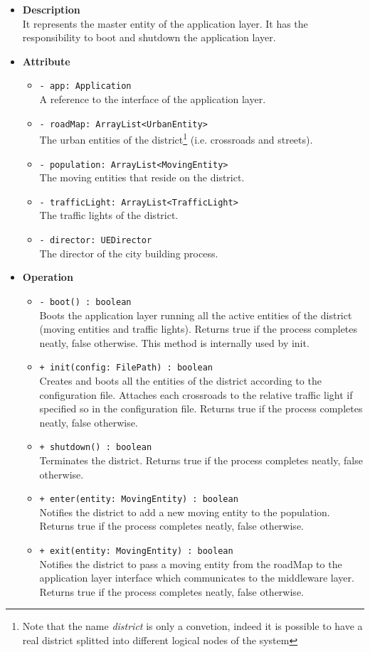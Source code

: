 \begin{itemize}
  \item \textbf{Description} \\
It represents the master entity of the application layer. 
It has the responsibility to boot and shutdown the application layer.
  \item \textbf{Attribute}
  \begin{itemize}
    \item \texttt{- app: Application} \\
A reference to the interface of the application layer.
    \item \texttt{- roadMap: ArrayList<UrbanEntity>} \\
The urban entities of the district\footnote{Note that the name 
\textit{district} is only a convetion, indeed it is possible to have a 
real district splitted into different logical nodes of the system}
(i.e. crossroads and streets). 
    \item \texttt{- population: ArrayList<MovingEntity>} \\
The moving entities that reside on the district.
    \item \texttt{- trafficLight: ArrayList<TrafficLight>} \\
The traffic lights of the district.
    \item \texttt{- director: UEDirector} \\ 
The director of the city building process.
  \end{itemize}
  \item \textbf{Operation}
  \begin{itemize} 
    \item \texttt{- boot() : boolean} \\
Boots the application layer running all the active entities of the 
district (moving entities and traffic lights).
Returns true if the process completes neatly, false otherwise. 
This method is internally used by init.
    \item \texttt{+ init(config: FilePath) : boolean} \\
Creates and boots all the entities of the district according to the 
configuration file. Attaches each crossroads to the relative traffic light
if specified so in the configuration file. 
Returns true if the process completes neatly, false otherwise.
    \item \texttt{+ shutdown() : boolean} \\
Terminates the district. Returns true if the process completes neatly,
false otherwise.
    \item \texttt{+ enter(entity: MovingEntity) : boolean} \\
Notifies the district to add a new moving entity to the population.
Returns true if the process completes neatly, false otherwise.
    \item \texttt{+ exit(entity: MovingEntity) : boolean} \\
Notifies the district to pass a moving entity from the roadMap to the 
application layer interface which communicates to the middleware layer.
Returns true if the process completes neatly, false otherwise.
  \end{itemize}
\end{itemize} 

